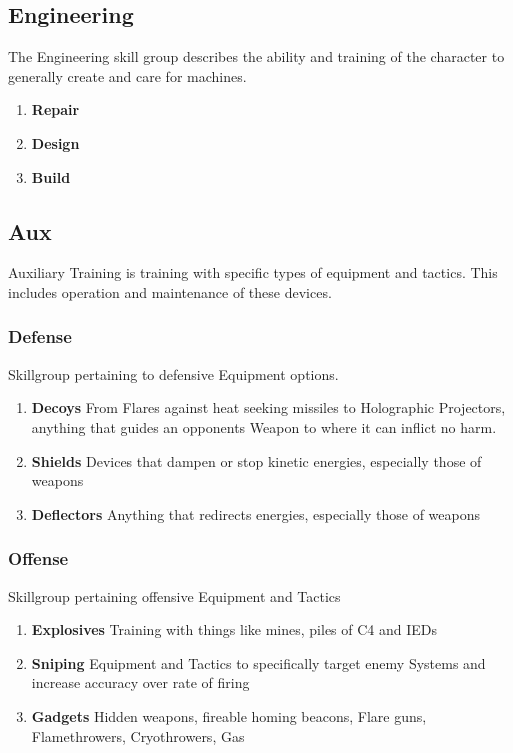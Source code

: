 \subsection{Engineering}\label{subsec:engineering}
The Engineering skill group describes the ability and training of the 
character to generally create and care for machines.
\begin{enumerate}[label= -]
    \item \textbf{Repair} 
    \item \textbf{Design} 
    \item \textbf{Build} 
\end{enumerate}
\subsection{Aux}\label{subsec:aux}
Auxiliary Training is training with specific types of equipment and tactics.
This includes operation and maintenance of these devices.
\subsubsection{Defense}
Skillgroup pertaining to defensive Equipment options.
\begin{enumerate}[label= -]
    \item \textbf{Decoys} From Flares against heat seeking missiles to Holographic Projectors, anything that guides
     an opponents Weapon to where it can inflict no harm.
    \item \textbf{Shields} Devices that dampen or stop kinetic energies, especially those of weapons
    \item \textbf{Deflectors} Anything that redirects energies, especially those of weapons
\end{enumerate}
\subsubsection{Offense}
Skillgroup pertaining offensive Equipment and Tactics
\begin{enumerate}[label= -]
    \item \textbf{Explosives} Training with things like mines, piles of C4 and IEDs
    \item \textbf{Sniping} Equipment and Tactics to specifically target enemy Systems and increase accuracy
    over rate of firing
    \item \textbf{Gadgets} Hidden weapons, fireable homing beacons, Flare guns, Flamethrowers, Cryothrowers, Gas
\end{enumerate}
